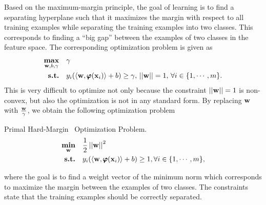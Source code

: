 {Based on the maximum-margin principle, the goal of learning is to find a separating hyperplane such that it maximizes the margin with respect to all training examples while separating the training examples into two classes.
This corresponds to finding a ``big gap'' between the examples of two classes in the feature space.
The corresponding optimization problem \citep{Bishop07} is given as
\begin{align*}
	\underset{\mathbf {w},b,\gamma}{\textbf{max}} &\quad \gamma\\
	\textbf{s.t.} &\quad y_i(\langle \mathbf {w}, \pmb \varphi(\mathbf {x}_i) \rangle+b) \ge \gamma, \, \left|\left| \mathbf {w} \right|\right|=1, \, \forall i\in\{1,\cdots,m\}.
\end{align*}
This is very difficult to optimize not only because the constraint $\left|\left| \mathbf {w} \right|\right|=1$ is non-convex, but also the optimization is not in any standard form.
By replacing $\mathbf {w}$ with $\frac{\mathbf {w}}{\gamma}$, we obtain the following optimization problem

\begin{definition}{Primal Hard-Margin \svm\ Optimization Problem.}\label{hardsvmprimal}
	\begin{align*}
		\underset{\mathbf {w}}{\textbf{min}} & \quad\frac{1}{2}\left|\left| \mathbf {w} \right|\right|^2\\
		\textbf{s.t.} & \quad y_i(\langle \mathbf {w}, \pmb \varphi(\mathbf {x}_i) \rangle + b) \ge 1, \forall i\in\{1,\cdots,m\},
	\end{align*}
\end{definition}
\noindent
where the goal is to find a weight vector of the minimum norm which corresponds to maximize the margin between the examples of two classes.
The constraints state that the training examples should be correctly separated.

}
